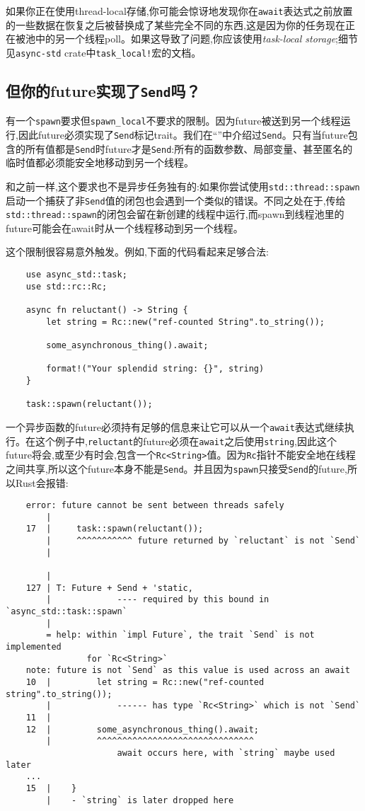 如果你正在使用thread-local存储,你可能会惊讶地发现你在\texttt{await}表达式之前放置的一些数据在恢复之后被替换成了某些完全不同的东西,这是因为你的任务现在正在被池中的另一个线程poll。如果这导致了问题,你应该使用\emph{task-local storage};细节见\texttt{async-std} crate中\texttt{task\_local!}宏的文档。

\subsection{但你的future实现了\texttt{Send}吗？}
有一个\texttt{spawn}要求但\texttt{spawn\_local}不要求的限制。因为future被送到另一个线程运行,因此future必须实现了\texttt{Send}标记trait。我们在“”中介绍过\texttt{Send}。只有当future包含的所有值都是\texttt{Send}时future才是\texttt{Send}:所有的函数参数、局部变量、甚至匿名的临时值都必须能安全地移动到另一个线程。

和之前一样,这个要求也不是异步任务独有的:如果你尝试使用\texttt{std::thread::spawn}启动一个捕获了非\texttt{Send}值的闭包也会遇到一个类似的错误。不同之处在于,传给\texttt{std::thread::spawn}的闭包会留在新创建的线程中运行,而spawn到线程池里的future可能会在await时从一个线程移动到另一个线程。

这个限制很容易意外触发。例如,下面的代码看起来足够合法:
\begin{verbatim}
    use async_std::task;
    use std::rc::Rc;

    async fn reluctant() -> String {
        let string = Rc::new("ref-counted String".to_string());

        some_asynchronous_thing().await;

        format!("Your splendid string: {}", string)
    }

    task::spawn(reluctant());
\end{verbatim}

一个异步函数的future必须持有足够的信息来让它可以从一个\texttt{await}表达式继续执行。在这个例子中,\texttt{reluctant}的future必须在\texttt{await}之后使用\texttt{string},因此这个future将会,或至少有时会,包含一个\texttt{Rc<String>}值。因为\texttt{Rc}指针不能安全地在线程之间共享,所以这个future本身不能是\texttt{Send}。并且因为\texttt{spawn}只接受\texttt{Send}的future,所以Rust会报错:
\begin{verbatim}
    error: future cannot be sent between threads safely
        |
    17  |     task::spawn(reluctant());
        |     ^^^^^^^^^^^ future returned by `reluctant` is not `Send`
        |

        |
    127 | T: Future + Send + 'static,
        |             ---- required by this bound in `async_std::task::spawn`
        |
        = help: within `impl Future`, the trait `Send` is not implemented
                for `Rc<String>`
    note: future is not `Send` as this value is used across an await
    10  |         let string = Rc::new("ref-counted string".to_string());
        |             ------ has type `Rc<String>` which is not `Send`
    11  |
    12  |         some_asynchronous_thing().await;
        |         ^^^^^^^^^^^^^^^^^^^^^^^^^^^^^^^
                      await occurs here, with `string` maybe used later
    ...
    15  |    }
        |    - `string` is later dropped here
\end{verbatim}

